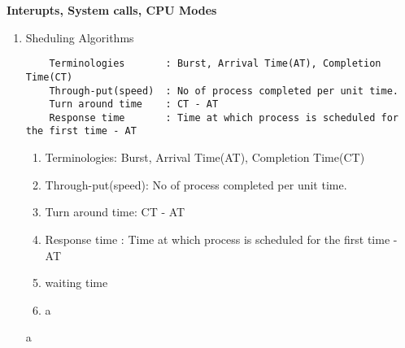 
\centerline{\textbf{ \LARGE Interupts, System calls, CPU Modes}}




\begin{enumerate}

  \item Sheduling Algorithms
  \begin{lstlisting}
    Terminologies       : Burst, Arrival Time(AT), Completion Time(CT)
    Through-put(speed)  : No of process completed per unit time.
    Turn around time    : CT - AT
    Response time       : Time at which process is scheduled for the first time - AT

  \end{lstlisting}

  \begin{enumerate}
      \item Terminologies: Burst, Arrival Time(AT), Completion Time(CT)
      \item Through-put(speed): No of process completed per unit time.
      \item Turn around time: CT - AT
      \item Response time   : Time at which process is scheduled for the first time - AT
      \item waiting time
      \item a
  \end{enumerate}

  \begin{minipage}{\linewidth}
  a
  \end{minipage}



\end{enumerate}








